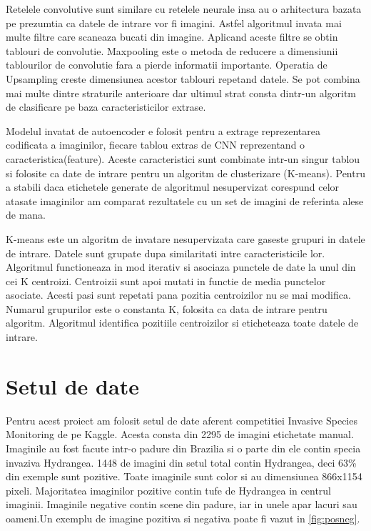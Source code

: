\documentclass{article}
\begin{document}
Retelele convolutive sunt similare cu retelele neurale insa au o arhitectura bazata pe prezumtia ca datele de intrare vor fi imagini. Astfel algoritmul invata mai multe filtre care scaneaza bucati din imagine. Aplicand aceste filtre se obtin tablouri de convolutie. Maxpooling este o metoda de reducere a dimensiunii tablourilor de convolutie fara a pierde informatii importante. Operatia de Upsampling creste dimensiunea acestor tablouri repetand datele. Se pot combina mai multe dintre straturile anterioare dar ultimul strat consta dintr-un algoritm de clasificare pe baza caracteristicilor extrase\cite{WEBSITE:11}.

Modelul invatat de autoencoder e folosit pentru a extrage reprezentarea codificata a imaginilor, fiecare tablou extras de CNN reprezentand o caracteristica(feature). Aceste caracteristici sunt combinate intr-un singur tablou si folosite ca date de intrare pentru un algoritm de clusterizare (K-means). Pentru a stabili daca etichetele generate de algoritmul nesupervizat corespund celor atasate imaginilor am comparat rezultatele cu un set de imagini de referinta alese de mana.

K-means este un algoritm de invatare nesupervizata care gaseste grupuri in datele de intrare. Datele sunt grupate dupa similaritati intre caracteristicile lor. Algoritmul functioneaza in mod iterativ si asociaza punctele de date la unul din cei K centroizi. Centroizii sunt apoi mutati in functie de media punctelor asociate. Acesti pasi sunt repetati pana pozitia centroizilor nu se mai modifica. Numarul grupurilor este o constanta K, folosita ca data de intrare pentru algoritm. Algoritmul identifica pozitiile centroizilor si eticheteaza toate datele de intrare\cite{WEBSITE:10}.

\section{Setul de date}
Pentru acest proiect am folosit setul de date aferent competitiei Invasive Species Monitoring\cite{WEBSITE:6} de pe Kaggle. Acesta consta din 2295 de imagini etichetate manual. Imaginile au fost facute intr-o padure din Brazilia si o parte din ele contin specia invaziva Hydrangea. 1448 de imagini din setul total contin Hydrangea, deci 63\% din exemple sunt pozitive. Toate imaginile sunt color si au dimensiunea 866x1154 pixeli. Majoritatea imaginilor pozitive contin tufe de Hydrangea in centrul imaginii. Imaginile negative contin scene din padure, iar in unele apar lacuri sau oameni.Un exemplu de imagine pozitiva si negativa poate fi vazut in \ref{fig:posneg}.
\end{document}
